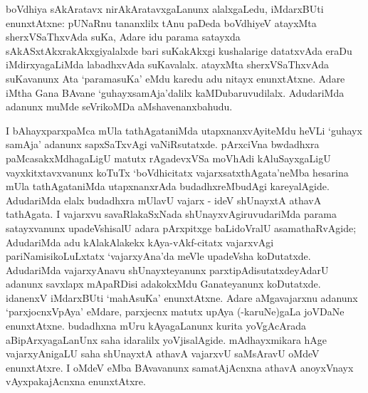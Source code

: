 boVdhiya sAkAratavx nirAkAratavxgaLanunx alalxgaLedu, iMdarxBUti enunxtAtxne: pUNaRnu tananxlilx tAnu paDeda boVdhiyeV atayxMta sherxVSaThxvAda suKa, Adare idu parama satayxda sAkASxtAkxrakAkxgiyalalxde bari suKakAkxgi kushalarige datatxvAda eraDu iMdirxyagaLiMda labadhxvAda suKavalalx. atayxMta sherxVSaThxvAda suKavanunx Ata `paramasuKa' eMdu karedu adu nitayx enunxtAtxne. Adare iMtha Gana BAvane `guhayxsamAja'dalilx kaMDubaruvudilalx. AdudariMda adanunx muMde seVrikoMDa aMshavenanxbahudu.

I bAhayxparxpaMca mUla tathAgataniMda utapxnanxvAyiteMdu heVLi `guhayx samAja' adanunx sapxSaTxvAgi vaNiRsutatxde. pArxciVna bwdadhxra paMcasakxMdhagaLigU matutx rAgadevxVSa moVhAdi kAluSayxgaLigU vayxkitxtavxvanunx koTuTx `boVdhicitatx vajarxsatxthAgata'neMba hesarina mUla tathAgataniMda utapxnanxrAda budadhxreMbudAgi kareyalAgide. AdudariMda elalx budadhxra mUlavU vajarx - ideV shUnayxtA athavA tathAgata. I vajarxvu savaRlakaSxNada shUnayxvAgiruvudariMda parama satayxvanunx upadeVshisalU adara pArxpitxge baLidoVralU asamathaRvAgide; AdudariMda adu kAlakAlakekx kAya-vAkf-citatx vajarxvAgi pariNamisikoLuLxtatx `vajarxyAna'da meVle upadeVsha koDutatxde. AdudariMda vajarxyAnavu shUnayxteyanunx parxtipAdisutatxdeyAdarU adanunx savxlapx mApaRDisi adakokxMdu Ganateyanunx koDutatxde. idanenxV iMdarxBUti `mahAsuKa' enunxtAtxne. Adare aMgavajarxnu adanunx `parxjocnxVpAya' eMdare, parxjecnx matutx upAya (-karuNe)gaLa joVDaNe enunxtAtxne. budadhxna mUru kAyagaLanunx kurita yoVgAcArada aBipArxyagaLanUnx saha idaralilx yoVjisalAgide. mAdhayxmikara hAge vajarxyAnigaLU saha shUnayxtA athavA vajarxvU saMsAravU oMdeV enunxtAtxre. I oMdeV eMba BAvavanunx samatAjAcnxna athavA anoyxVnayx vAyxpakajAcnxna enunxtAtxre.


